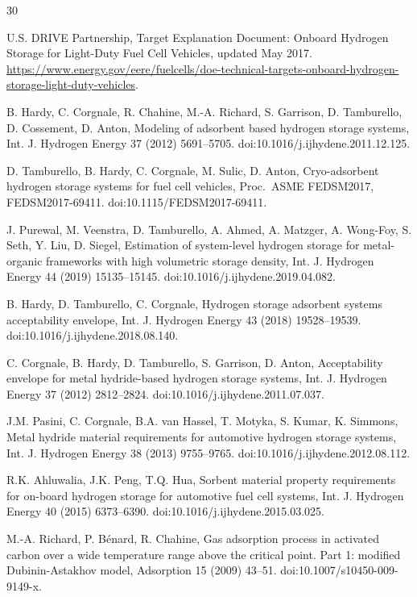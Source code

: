 \documentclass[preprint,12pt]{elsarticle}
\begin{document}

\begin{thebibliography}{30}

 U.S. DRIVE Partnership, Target Explanation Document:
Onboard Hydrogen Storage for Light-Duty Fuel Cell Vehicles, updated May
2017. \url{https://www.energy.gov/eere/fuelcells/doe-technical-targets-onboard-hydrogen-storage-light-duty-vehicles}.

 B. Hardy, C. Corgnale, R. Chahine, M.-A. Richard, S.
Garrison, D. Tamburello, D. Cossement, D. Anton, Modeling of adsorbent
based hydrogen storage systems, Int. J. Hydrogen Energy 37 (2012)
5691--5705. doi:10.1016/j.ijhydene.2011.12.125.

 D. Tamburello, B. Hardy, C. Corgnale, M. Sulic, D.
Anton, Cryo-adsorbent hydrogen storage systems for fuel cell vehicles,
Proc.\ ASME FEDSM2017, FEDSM2017-69411. doi:10.1115/FEDSM2017-69411.

 J. Purewal, M. Veenstra, D. Tamburello, A. Ahmed, A.
Matzger, A. Wong-Foy, S. Seth, Y. Liu, D. Siegel, Estimation of
system-level hydrogen storage for metal-organic frameworks with high
volumetric storage density, Int. J. Hydrogen Energy 44 (2019) 15135--15145.
doi:10.1016/j.ijhydene.2019.04.082.

 B. Hardy, D. Tamburello, C. Corgnale, Hydrogen storage
adsorbent systems acceptability envelope, Int. J. Hydrogen Energy 43 (2018)
19528--19539. doi:10.1016/j.ijhydene.2018.08.140.

 C. Corgnale, B. Hardy, D. Tamburello, S. Garrison,
D. Anton, Acceptability envelope for metal hydride-based hydrogen storage
systems, Int. J. Hydrogen Energy 37 (2012) 2812--2824.
doi:10.1016/j.ijhydene.2011.07.037.

 J.M. Pasini, C. Corgnale, B.A. van Hassel, T. Motyka,
S. Kumar, K. Simmons, Metal hydride material requirements for automotive
hydrogen storage systems, Int. J. Hydrogen Energy 38 (2013) 9755--9765.
doi:10.1016/j.ijhydene.2012.08.112.

 R.K. Ahluwalia, J.K. Peng, T.Q. Hua, Sorbent
material property requirements for on-board hydrogen storage for automotive
fuel cell systems, Int. J. Hydrogen Energy 40 (2015) 6373--6390.
doi:10.1016/j.ijhydene.2015.03.025.

 M.-A. Richard, P. B\'enard, R. Chahine, Gas
adsorption process in activated carbon over a wide temperature range above
the critical point. Part 1: modified Dubinin-Astakhov model, Adsorption 15
(2009) 43--51. doi:10.1007/s10450-009-9149-x.


\end{thebibliography}
\end{document}
